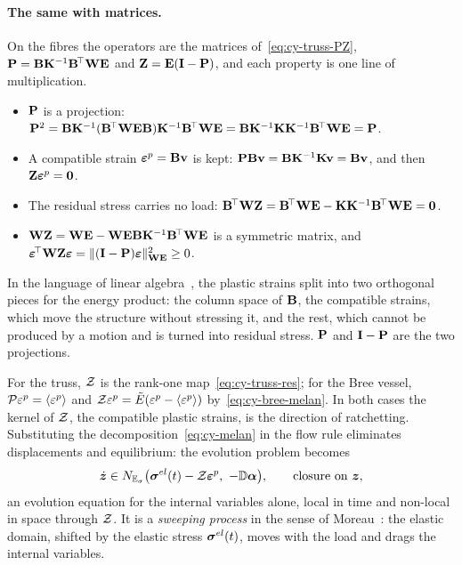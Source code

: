 \paragraph{The same with matrices.}
On the fibres the operators are the matrices of~\eqref{eq:cy-truss-PZ},
$\mathbf{P}=\mathbf{B}\mathbf{K}^{-1}\mathbf{B}^{\!\top}\mathbf{W}\mathbf{E}$ and $\mathbf{Z}=\mathbf{E}(\mathbf{I}-\mathbf{P})$,
and each property is one line of multiplication.
\begin{itemize}
  \item $\mathbf{P}$ is a projection:
  $\mathbf{P}^2=\mathbf{B}\mathbf{K}^{-1}(\mathbf{B}^{\!\top}\mathbf{W}\mathbf{E}\mathbf{B})\mathbf{K}^{-1}\mathbf{B}^{\!\top}\mathbf{W}\mathbf{E}
  =\mathbf{B}\mathbf{K}^{-1}\mathbf{K}\mathbf{K}^{-1}\mathbf{B}^{\!\top}\mathbf{W}\mathbf{E}=\mathbf{P}$.
  \item A compatible strain $\boldsymbol\varepsilon^p=\mathbf{B}\mathbf{v}$ is kept:
  $\mathbf{P}\mathbf{B}\mathbf{v}=\mathbf{B}\mathbf{K}^{-1}\mathbf{K}\mathbf{v}=\mathbf{B}\mathbf{v}$, and then
  $\mathbf{Z}\boldsymbol\varepsilon^p=\bm{0}$.
  \item The residual stress carries no load:
  $\mathbf{B}^{\!\top}\mathbf{W}\mathbf{Z}=\mathbf{B}^{\!\top}\mathbf{W}\mathbf{E}-\mathbf{K}\mathbf{K}^{-1}\mathbf{B}^{\!\top}\mathbf{W}\mathbf{E}=\mathbf{0}$.
  \item $\mathbf{W}\mathbf{Z}=\mathbf{W}\mathbf{E}-\mathbf{W}\mathbf{E}\mathbf{B}\mathbf{K}^{-1}\mathbf{B}^{\!\top}\mathbf{W}\mathbf{E}$
  is a symmetric matrix, and
  $\boldsymbol\varepsilon^{\!\top}\mathbf{W}\mathbf{Z}\boldsymbol\varepsilon
  =\lVert (\mathbf{I}-\mathbf{P})\boldsymbol\varepsilon\rVert^2_{\mathbf{W}\mathbf{E}}\ge0$.
\end{itemize}
In the language of linear algebra~\cite{Strang1986c}, the plastic strains
split into two orthogonal pieces for the energy product: the column space of
$\mathbf{B}$, the compatible strains, which move the structure without stressing
it, and the rest, which cannot be produced by a motion and is turned into
residual stress. $\mathbf{P}$ and $\mathbf{I}-\mathbf{P}$ are the two projections.

For the truss, $\mathcal{Z}$ is the rank-one map~\eqref{eq:cy-truss-res}; for the
Bree vessel, $\mathcal{P}\varepsilon^p=\langle\varepsilon^p\rangle$ and
$\mathcal{Z}\varepsilon^p=\tilde E(\varepsilon^p-\langle\varepsilon^p\rangle)$
by~\eqref{eq:cy-bree-melan}. In both cases the kernel of $\mathcal{Z}$, the
compatible plastic strains, is the direction of ratchetting. Substituting the
decomposition~\eqref{eq:cy-melan} in the flow rule eliminates displacements
and equilibrium: the evolution problem becomes
\begin{equation}\label{eq:cy-reduced}
  \dot{\bm{z}}\in N_{\mathbb{E}_{\sigma}}\bigl(\bm{\sigma}^{el}(t)-\mathcal{Z}\bm{\varepsilon}^{p},\ -\mathbb{D}\bm{\alpha}\bigr),
  \qquad \text{closure on }\bm{z} ,
\end{equation}
an evolution equation for the internal variables alone, local in time and
non-local in space through $\mathcal{Z}$. It is a \emph{sweeping process} in the
sense of Moreau~\cite{Moreau1977}: the elastic domain, shifted by the elastic
stress $\bm{\sigma}^{el}(t)$, moves with the load and drags the internal variables.

